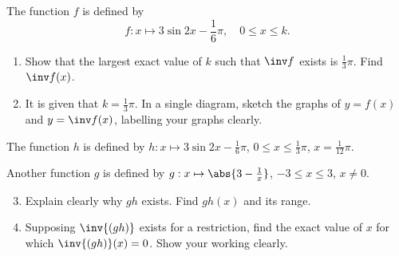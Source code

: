 \begin{problem}
    The function $f$ is defined by \[f : x \mapsto 3\sin{2x - \frac16 \pi}, \quad 0 \leq x \leq k.\]
    \begin{enumerate}
        \item Show that the largest exact value of $k$ such that $\inv f$ exists is $\frac13 \pi$. Find $\inv f(x)$.
        \item It is given that $k = \frac13 \pi$. In a single diagram, sketch the graphs of $y = f(x)$ and $y = \inv f(x)$, labelling your graphs clearly.
    \end{enumerate}

    The function $h$ is defined by $h : x \mapsto 3\sin{2x - \frac16 \pi}$, $0 \leq x \leq \frac13 \pi$, $x = \frac1{12} \pi$.

    Another function $g$ is defined by $g : x \mapsto \abs{3 - \frac1{x}}$, $-3 \leq x \leq 3$, $x \neq 0$.

    \begin{enumerate}
        \setcounter{enumi}{2}
        \item Explain clearly why $gh$ exists. Find $gh(x)$ and its range.
        \item Supposing $\inv{(gh)}$ exists for a restriction, find the exact value of $x$ for which $\inv{(gh)} (x) = 0$. Show your working clearly.
    \end{enumerate}
\end{problem}
